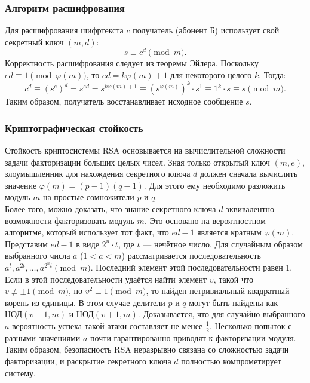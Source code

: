 \subsubsection{Алгоритм расшифрования}
Для расшифрования шифртекста $c$ получатель (абонент Б) использует свой секретный ключ $(m, d)$:
\[ s \equiv c^d \pmod m. \]
Корректность расшифрования следует из теоремы Эйлера. Поскольку $ed \equiv 1 \pmod{\varphi(m)}$, то $ed = k\varphi(m) + 1$ для некоторого целого $k$. Тогда:
\[ c^d \equiv (s^e)^d = s^{ed} = s^{k\varphi(m)+1} \equiv (s^{\varphi(m)})^k \cdot s^1 \equiv 1^k \cdot s \equiv s \pmod m. \]
Таким образом, получатель восстанавливает исходное сообщение $s$.

\subsubsection{Криптографическая стойкость}
Стойкость криптосистемы RSA основывается на вычислительной сложности задачи факторизации больших целых чисел. Зная только открытый ключ $(m, e)$, злоумышленник для нахождения секретного ключа $d$ должен сначала вычислить значение $\varphi(m)=(p-1)(q-1)$. Для этого ему необходимо разложить модуль $m$ на простые сомножители $p$ и $q$.\\

\noindent Более того, можно доказать, что знание секретного ключа $d$ эквивалентно возможности факторизовать модуль $m$. Это основано на вероятностном алгоритме, который использует тот факт, что $ed - 1$ является кратным $\varphi(m)$. Представим $ed - 1$ в виде $2^n \cdot t$, где $t$ — нечётное число. Для случайным образом выбранного числа $a$ ($1 < a < m$) рассматривается последовательность $a^t, a^{2t}, \dots, a^{2^n t} \pmod m$. Последний элемент этой последовательности равен 1.\\

\noindent Если в этой последовательности удаётся найти элемент $v$, такой что $v \not\equiv \pm 1 \pmod m$, но $v^2 \equiv 1 \pmod m$, то найден нетривиальный квадратный корень из единицы. В этом случае делители $p$ и $q$ могут быть найдены как $\text{НОД}(v-1, m)$ и $\text{НОД}(v+1, m)$. Доказывается, что для случайно выбранного $a$ вероятность успеха такой атаки составляет не менее $\frac{1}{2}$. Несколько попыток с разными значениями $a$ почти гарантированно приводят к факторизации модуля.\\

\noindent Таким образом, безопасность RSA неразрывно связана со сложностью задачи факторизации, и раскрытие секретного ключа $d$ полностью компрометирует систему.